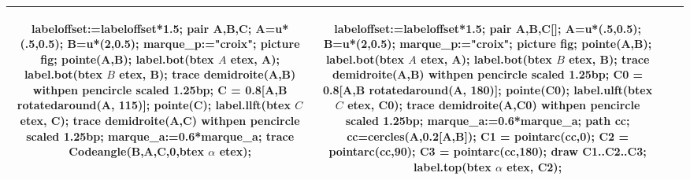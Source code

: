 \begin{changemargin}{0mm}{-15mm}
\begin{definition}[Classement des angles selon leur mesure $\alpha=\widehat{BAC}$]
{\begin{tabular}{|*4{c|}}
\begin{Geometrie}[CoinBG={(-u,0)},CoinHD={(2.5u,2u)}]
            labeloffset:=labeloffset*1.5;
            pair A,B,C;
            A=u*(.5,0.5);
            B=u*(2,0.5);
            marque_p:="croix";
            picture fig;
            pointe(A,B);
            label.bot(btex $A$ etex, A);
            label.bot(btex $B$ etex, B);
            trace demidroite(A,B) withpen pencircle scaled 1.25bp;
            C = 0.8[A,B rotatedaround(A, 115)];
            pointe(C);
            label.llft(btex $C$ etex, C);
            trace demidroite(A,C) withpen pencircle scaled 1.25bp;
            marque_a:=0.6*marque_a;
            trace Codeangle(B,A,C,0,btex $\alpha$ etex);
        \end{Geometrie}
        &
        \begin{Geometrie}[CoinBG={(-u,0)},CoinHD={(2.5u,2u)}]
            labeloffset:=labeloffset*1.5;            
            pair A,B,C[];
            A=u*(.5,0.5);
            B=u*(2,0.5);
            marque_p:="croix";
            picture fig;
            pointe(A,B);
            label.bot(btex $A$ etex, A);
            label.bot(btex $B$ etex, B);
            trace demidroite(A,B) withpen pencircle scaled 1.25bp;
            C0 = 0.8[A,B rotatedaround(A, 180)];
            pointe(C0);
            label.ulft(btex $C$ etex, C0);
            trace demidroite(A,C0) withpen pencircle scaled 1.25bp;
            marque_a:=0.6*marque_a;
            path cc;
            cc=cercles(A,0.2[A,B]);
            C1 = pointarc(cc,0);
            C2 = pointarc(cc,90);
            C3 = pointarc(cc,180);
            draw C1..C2..C3;
            label.top(btex $\alpha$ etex, C2);
        \end{Geometrie}\\\hline        
    \end{tabular}    
    }


\end{definition}
\end{changemargin}
